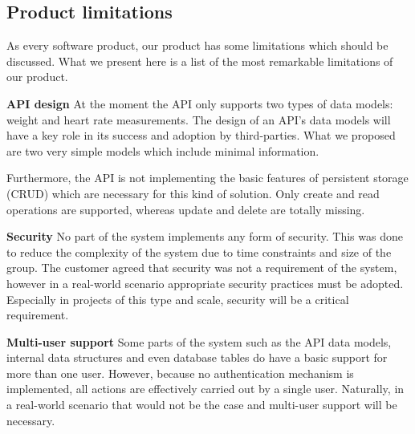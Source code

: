 \subsection{Product limitations}
\label{subsec:limitations}

As every software product, our product has some limitations which should be discussed.
What we present here is a list of the most remarkable limitations of our product.

\textbf{API design}\newline
At the moment the API only supports two types of data models: weight and heart rate measurements.
The design of an API's data models will have a key role in its success and adoption by
third-parties. What we proposed are two very simple models which include minimal information.
\iffalse
A functional system should have a much more extensive and complete API
which should be thoroughly documented and accompanied by a number of examples and/or libraries.
Data models should be complete and able to represent a meaningful amount of information,
and possibly exhibit some degree of interoperability with other established standards.
\fi
Furthermore, the API is not implementing the basic features of persistent storage (CRUD)
which are necessary for this kind of solution. Only create and read operations are supported,
whereas update and delete are totally missing.%

\textbf{Security}\newline
No part of the system implements any form of security.
This was done to reduce the complexity of the system due to time constraints and size of the group.
The customer agreed that security was not a requirement of the system, however in a real-world scenario
appropriate security practices must be adopted.
Especially in projects of this type and scale, security will be a critical requirement.


\textbf{Multi-user support}\newline
Some parts of the system such as the API data models, internal data structures and even
database tables do have a basic support for more than one user. However, because no authentication
mechanism is implemented, all actions are effectively carried out by a single user.
Naturally, in a real-world scenario that would not be the case and multi-user support will
be necessary.

